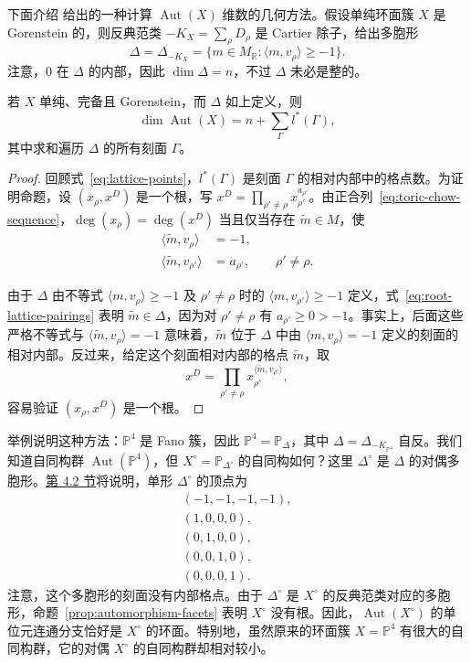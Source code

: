 下面介绍  给出的一种计算 $\operatorname{Aut}(X)$ 维数的几何方法。假设单纯环面簇 $X$ 是 Gorenstein 的，则反典范类 $-K_X=\sum_\rho D_\rho$ 是 Cartier 除子，给出多胞形
\[
\Delta=\Delta_{-K_X}=
\{m\in M_{\mathbb R}:\langle m,v_\rho\rangle\geq-1\}.
\]
注意，$0$ 在 $\Delta$ 的内部，因此 $\dim\Delta=n$，不过 $\Delta$ 未必是整的。

\begin{proposition}\label{prop:automorphism-facets}
若 $X$ 单纯、完备且 Gorenstein，而 $\Delta$ 如上定义，则
\[
\dim\operatorname{Aut}(X)=n+\sum_\Gamma l^*(\Gamma),
\]
其中求和遍历 $\Delta$ 的所有刻面 $\Gamma$。
\end{proposition}
\begin{proof}
回顾式~\eqref{eq:lattice-points}，$l^*(\Gamma)$ 是刻面 $\Gamma$ 的相对内部中的格点数。为证明命题，设 $(x_\rho,x^D)$ 是一个根，写 $x^D=\prod_{\rho'\ne\rho}x_{\rho'}^{a_{\rho'}}$。由正合列~\eqref{eq:toric-chow-sequence}，$\deg(x_\rho)=\deg(x^D)$ 当且仅当存在 $\widetilde m\in M$，使
\begin{equation}\label{eq:root-lattice-pairings}
\begin{aligned}
\langle\widetilde m,v_\rho\rangle&=-1,\\
\langle\widetilde m,v_{\rho'}\rangle&=a_{\rho'},\qquad\rho'\ne\rho.
\end{aligned}
\end{equation}

由于 $\Delta$ 由不等式 $\langle m,v_\rho\rangle\geq-1$ 及 $\rho'\ne\rho$ 时的 $\langle m,v_{\rho'}\rangle\geq-1$ 定义，式~\eqref{eq:root-lattice-pairings} 表明 $\widetilde m\in\Delta$，因为对 $\rho'\ne\rho$ 有 $a_{\rho'}\geq0>-1$。事实上，后面这些严格不等式与 $\langle\widetilde m,v_\rho\rangle=-1$ 意味着，$\widetilde m$ 位于 $\Delta$ 中由 $\langle m,v_\rho\rangle=-1$ 定义的刻面的相对内部。反过来，给定这个刻面相对内部的格点 $\widetilde m$，取
\[
x^D=\prod_{\rho'\ne\rho}x_{\rho'}^{\langle\widetilde m,v_{\rho'}\rangle},
\]
容易验证 $(x_\rho,x^D)$ 是一个根。
\end{proof}

举例说明这种方法：$\mathbb P^4$ 是 Fano 簇，因此 $\mathbb P^4=\mathbb P_\Delta$，其中 $\Delta=\Delta_{-K_{\mathbb P^4}}$ 自反。我们知道自同构群 $\operatorname{Aut}(\mathbb P^4)$，但 $X^\circ=\mathbb P_{\Delta^\circ}$ 的自同构如何？这里 $\Delta^\circ$ 是 $\Delta$ 的对偶多胞形。\hyperref[sec:quintic-revisited]{第 4.2 节}将说明，单形 $\Delta^\circ$ 的顶点为
\[
\begin{gathered}
(-1,-1,-1,-1),\\
(1,0,0,0),\\
(0,1,0,0),\\
(0,0,1,0),\\
(0,0,0,1).
\end{gathered}
\]
注意，这个多胞形的刻面没有内部格点。由于 $\Delta^\circ$ 是 $X^\circ$ 的反典范类对应的多胞形，命题~\ref{prop:automorphism-facets} 表明 $X^\circ$ 没有根。因此，$\operatorname{Aut}(X^\circ)$ 的单位元连通分支恰好是 $X^\circ$ 的环面。特别地，虽然原来的环面簇 $X=\mathbb P^4$ 有很大的自同构群，它的对偶 $X^\circ$ 的自同构群却相对较小。

